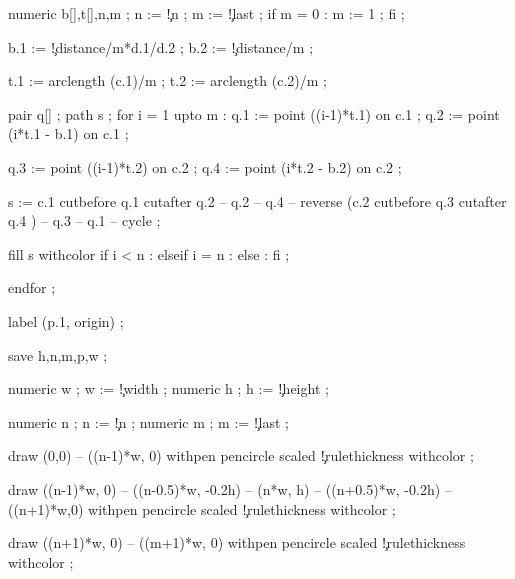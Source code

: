   numeric b[],t[],n,m ;
  n := \visualcounterparameter\c!n ;
  m := \visualcounterparameter\c!last ;
  if m = 0 : m := 1 ; fi ;

  b.1 := \visualcounterparameter\c!distance/m*d.1/d.2 ;
  b.2 := \visualcounterparameter\c!distance/m ;

  t.1 := arclength (c.1)/m ;
  t.2 := arclength (c.2)/m ;

  pair q[] ;
  path s ;
  for i = 1 upto m : 
    q.1 := point ((i-1)*t.1)        on c.1 ;
    q.2 := point (i*t.1 - b.1)  on c.1 ;

    q.3 := point ((i-1)*t.2)        on c.2 ;
    q.4 := point (i*t.2 - b.2)  on c.2 ;

    s := c.1 cutbefore q.1 cutafter q.2 -- q.2 -- q.4
       -- reverse (c.2 cutbefore q.3 cutafter q.4 ) -- q.3 -- q.1 
       -- cycle ;

    fill s withcolor 
      if i < n     :  
      elseif i = n : 
      else         : 
      fi ;

  endfor ;

  label (p.1, origin) ;

\stopuseMPgraphic

  save h,n,m,p,w ;

  numeric w ; w := \visualcounterparameter\c!width ;
  numeric h ; h := \visualcounterparameter\c!height ;

  numeric n ; n := \visualcounterparameter\c!n ;
  numeric m ; m := \visualcounterparameter\c!last ;

  draw (0,0) -- ((n-1)*w, 0) 
      withpen pencircle scaled \visualcounterparameter\c!rulethickness\space
      withcolor  ;

  draw ((n-1)*w, 0) -- ((n-0.5)*w, -0.2h) -- (n*w, h) -- ((n+0.5)*w, -0.2h) -- ((n+1)*w,0)
      withpen pencircle scaled \visualcounterparameter\c!rulethickness\space
      withcolor  ;

  draw ((n+1)*w, 0) -- ((m+1)*w, 0)
      withpen pencircle scaled \visualcounterparameter\c!rulethickness\space
      withcolor  ;

\stopuseMPgraphic

\protect
